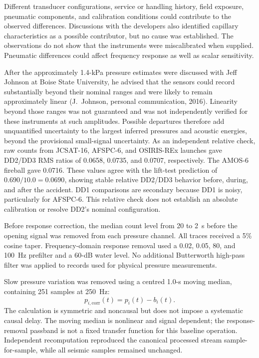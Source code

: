 \documentclass[]{seismica}
\begin{document}
Different transducer configurations, service or handling history, field
exposure, pneumatic components, and calibration conditions could contribute to
the observed differences. Discussions with the developers also identified
capillary characteristics as a possible contributor, but no cause was
established. The observations do not show that the instruments were
miscalibrated when supplied. Pneumatic differences could affect frequency
response as well as scalar sensitivity.

After the approximately 1.4-kPa pressure estimates were discussed with Jeff
Johnson at Boise State University, he advised that the sensors could record
substantially beyond their nominal ranges and were likely to remain
approximately linear (J.~Johnson, personal communication, 2016). Linearity
beyond those ranges was not guaranteed and was not independently verified
for these instruments at such amplitudes. Possible departures therefore add
unquantified uncertainty to the largest inferred pressures and acoustic
energies, beyond the provisional small-signal uncertainty. As an independent
relative check, raw counts from JCSAT-16, AFSPC-6, and OSIRIS-REx launches
gave DD2/DD3 RMS ratios of 0.0658, 0.0735, and 0.0707, respectively. The
AMOS-6 fireball gave 0.0716. These values agree with the lift-test prediction
of $0.690/10.0=0.0690$, showing stable relative DD2/DD3 behavior before,
during, and after the accident. DD1 comparisons are secondary because DD1 is
noisy, particularly for AFSPC-6. This relative check does not establish an
absolute calibration or resolve DD2's nominal configuration.

Before response correction, the median count level from 20 to 2~s before the
opening signal was removed from each pressure channel. All traces received a
5\% cosine taper. Frequency-domain response removal used a 0.02, 0.05, 80, and
100~Hz prefilter and a 60-dB water level. No additional Butterworth high-pass
filter was applied to records used for physical pressure measurements.

Slow pressure variation was removed using a centred 1.0-s moving median,
containing 251 samples at 250~Hz:
\begin{equation}
 p_{i,\mathrm{corr}}(t)=p_i(t)-b_i(t).
\end{equation}
The calculation is symmetric and noncausal but does not impose a systematic
causal delay. The moving median is nonlinear and signal dependent; the
response-removal passband is not a fixed transfer function for this baseline
operation. Independent recomputation reproduced the canonical processed
stream sample-for-sample, while all seismic samples remained unchanged.
\end{document}
